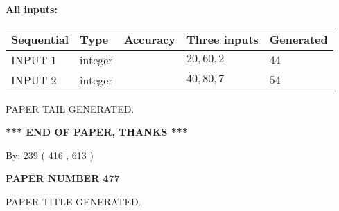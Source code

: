 \documentclass{ctexart}
\begin{document}
   
   
   
\noindent\vspace{0.1in}\hspace{-0.08in} {\textbf{\Large{All inputs: }}}
   
   
  
  
\noindent\begin{tabular}{|l|l|l|l|l|}
\hline
 Sequential & Type & Accuracy & Three inputs & Generated \\ 
\hline
 
 
  INPUT $  1 $ & integer &  & $
 20
 , 
 60
 , 
 2
 $ & $ 44 $ 
 \\  \hline  
 
 
  INPUT $  2 $ & integer &  & $
 40
 , 
 80
 , 
 7
 $ & $ 54 $ 
 \\  \hline  
 \end{tabular}
   
   
   
   
   
   
 \vspace{0.2in}
 
   
   
\vspace{2.0in} PAPER TAIL GENERATED.
   
   
   
   
\vspace{1.0in} 
{\textbf{\large{ *** END OF PAPER, THANKS *** }}} 
   
   
\hspace{1.0in} By: 
 239 ( 416 ,  613 )
   
   
   
   
\newpage 
\setcounter{page}{ 
   477001 } 
   
   
   
   
 {\textbf{ \Large{ PAPER NUMBER  477  }}}
   
   
\vspace{0.2in}
   
   
   
   
   
   
   
   
 \vspace{0.2in}
 
 
 
 
   
   
 PAPER TITLE GENERATED.
   
   
   
\vspace{0.2in}
   
\end{document}
